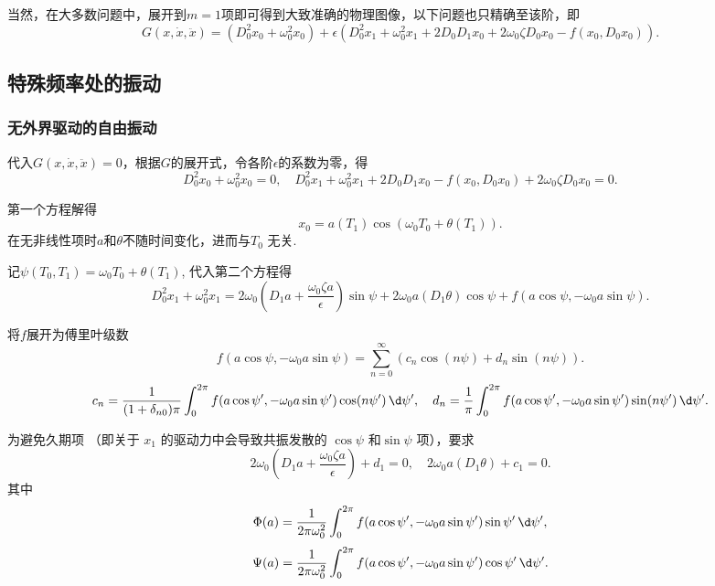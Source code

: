 当然，在大多数问题中，展开到\(m = 1\)项即可得到大致准确的物理图像，以下问题也只精确至该阶，即
\begin{equation*}
	G (x, \dot{x}, \ddot{x}) = (D_0^2 x_0 + \omega_0^2 x_0) + \epsilon\left(D_0^2 x_1 + \omega_0^2 x_1 + 2 D_0 D_1 x_0 + 2 \omega_0 \zeta D_0 x_0 - f(x_0, D_0 x_0)\right).
\end{equation*}

\subsection{特殊频率处的振动}

\subsubsection{无外界驱动的自由振动}

代入\(G (x, \dot{x}, \ddot{x}) = 0\)，根据\(G\)的展开式，令各阶\(\epsilon\)的系数为零，得
\begin{equation*}
	D_0^2 x_0 + \omega_0^2 x_0 = 0,\quad D_0^2 x_1 + \omega_0^2 x_1 + 2 D_0 D_1 x_0 - f(x_0, D_0 x_0) + 2 \omega_0 \zeta D_0 x_0 = 0.
\end{equation*}

第一个方程解得
\begin{equation*}
	x_0 = a (T_1) \cos(\omega_0 T_0 + \theta (T_1)).
\end{equation*}
在无非线性项时\(a\)和\(\theta\)不随时间变化，进而与\(T_0\) 无关.

记\(\psi (T_0, T_1) = \omega_0 T_0 + \theta (T_1)\), 代入第二个方程得
\begin{equation*}
	D_0^2 x_1 + \omega_0^2 x_1 = 2 \omega_0 \left( D_1 a + \dfrac{\omega_0 \zeta a}{\epsilon} \right) \sin\psi + 2 \omega_0 a (D_1 \theta) \cos\psi + f(a \cos\psi, -\omega_0 a \sin\psi).
\end{equation*}

将\(f\)展开为傅里叶级数
\begin{equation*}
	f(a \cos\psi, -\omega_0 a \sin\psi) = \sum_{n=0}^\infty (c_n \cos(n\psi) + d_n \sin(n\psi)).
\end{equation*}
\begin{equation*}
	c_n = \dfrac{1}{(1 + \delta_{n0})\pi} \int_0^{2\pi} f(a \cos\psi', -\omega_0 a \sin\psi') \cos(n\psi') \,\d \psi', \quad d_n = \dfrac{1}{\pi} \int_0^{2\pi} f(a \cos\psi', -\omega_0 a \sin\psi') \sin(n\psi') \,\d \psi'.
\end{equation*}

为避免久期项 （即关于  \(x_1\) 的驱动力中会导致共振发散的  \(\cos\psi\) 和\(\sin\psi\) 项），要求
\begin{equation*}
	2 \omega_0 \left( D_1 a + \dfrac{\omega_0 \zeta a}{\epsilon} \right) + d_1 = 0,\quad
	2 \omega_0 a (D_1 \theta) + c_1 = 0.
\end{equation*}
其中
\begin{equation*}
	\Phi(a) = \dfrac{1}{2 \pi \omega_0^2} \int_0^{2\pi} f(a \cos\psi', -\omega_0 a \sin\psi') \sin\psi' \,\d \psi',
\end{equation*}
\begin{equation*}
	\Psi(a) = \dfrac{1}{2 \pi \omega_0^2} \int_0^{2\pi} f(a \cos\psi', -\omega_0 a \sin\psi') \cos\psi' \,\d \psi'.
\end{equation*}

